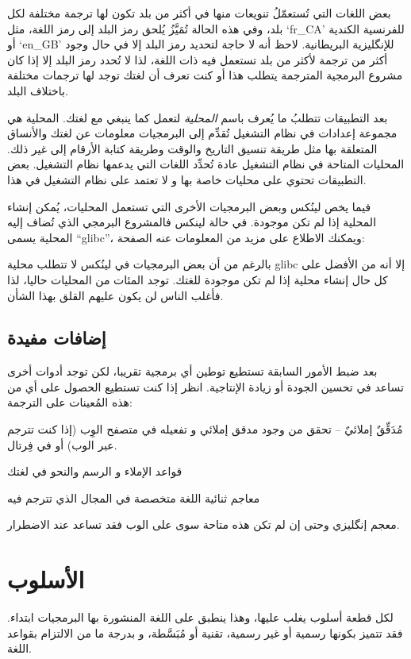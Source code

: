 بعض اللغات التي تُستعمّلُ تنويعات منها في أكثر من بلد تكون لها ترجمة
مختلفة لكل بلد، وفي هذه الحالة تُمَيَّزُ يُلحق رمز البلد إلى رمز اللغة،
مثل ‘fr\_CA’ للفرنسية الكندية أو ‘en\_GB’ للإنگليزية البريطانية. لاحظ
أنه لا حاجة لتحديد رمز البلد إلا في حال وجود أكثر من ترجمة لأكثر من بلد
تستعمل فيه ذات اللغة، لذا لا تُحدد رمز البلد إلا إذا كان مشروع البرمجية
المترجمة يتطلب هذا أو كنت تعرف أن لغتك توجد لها ترجمات مختلفة باختلاف
البلد.

بعد التطبيقات تتطلبُ ما يُعرف باسم {\it المحلية} لتعمل كما ينبغي مع
لغتك. المحلية هي مجموعة إعدادات في نظام التشغيل تُقدِّم إلى البرمجيات
معلومات عن لغتك والأنساق المتعلقة بها مثل طريقة تنسيق التاريخ والوقت
وطريقة كتابة الأرقام إلى غير ذلك. المحليات المتاحة في نظام التشغيل عادة
تُحدِّد اللغات التي يدعمها نظام التشغيل. بعض التطبيقات تحتوي على محليات
خاصة بها و لا تعتمد على نظام التشغيل في هذا.

فيما يخص لينُكس وبعض البرمجيات الأخرى التي تستعمل المحليات، يُمكن إنشاء
المحلية إذا لم تكن موجودة. في حالة لينكس فالمشروع البرمجي الذي تُضاف
إليه المحلية يسمى “glibc”، ويمكنك الاطلاع على مزيد من المعلومات عنه
الصفحة:


بالرغم من أن بعض البرمجيات في لينُكس لا تتطلب محلية glibc إلا أنه من
الأفضل على كل حال إنشاء محلية إذا لم تكن موجودة للغتك. توجد المئات من
المحليات حاليا، لذا فأغلب الناس لن يكون عليهم القلق بهذا الشأن.

\section{إضافات مفيدة}
بعد ضبط الأمور السابقة تستطيع توطين أي برمجية تقريبا، لكن توجد أدوات
أخرى تساعد في تحسين الجودة أو زيادة الإنتاجية. انظر إذا كنت تستطيع
الحصول على أي من هذه المُعينات على الترجمة:

\startitemize[1]
\item مُدَقِّقٌ إملائيٌ – تحقق من وجود مدقق إملائي و تفعيله في متصفح
الوِب (إذا كنت تترجم عبر الوب) أو في فِرتال.
\item قواعد الإملاء و الرسم والنحو في لغتك
\item معاجم ثنائية اللغة متخصصة في المجال الذي تترجم فيه
\item معجم إنگليزي
\stopitemize
وحتى إن لم تكن هذه متاحة سوى على الوب فقد تساعد عند الاضطرار.

\chapter{الأسلوب}
لكل قطعة أسلوب يغلب عليها، وهذا ينطبق على اللغة المنشورة بها البرمجيات
ابتداء. فقد تتميز بكونها رسمية أو غير رسمية، تقنية أو مُبَسَّطة، و
بدرجة ما من الالتزام بقواعد اللغة.


